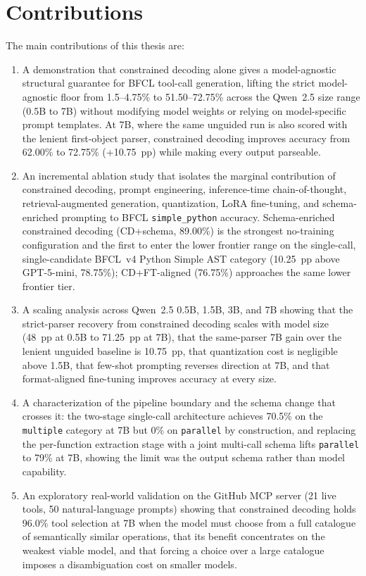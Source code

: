 \section{Contributions}

The main contributions of this thesis are:

\begin{enumerate}
    \item A demonstration that constrained decoding alone gives a
    model-agnostic structural guarantee for BFCL tool-call generation, lifting
    the strict model-agnostic floor from 1.5--4.75\% to 51.50--72.75\% across
    the Qwen~2.5 size range (0.5B to 7B) without modifying model weights or
    relying on model-specific prompt templates. At 7B, where the same unguided
    run is also scored with the lenient first-object parser, constrained
    decoding improves accuracy from 62.00\% to 72.75\% (+10.75~pp) while
    making every output parseable.
    \item An incremental ablation study that isolates the marginal
    contribution of constrained decoding, prompt engineering,
    inference-time chain-of-thought, retrieval-augmented generation,
    quantization, LoRA fine-tuning, and schema-enriched prompting to
    BFCL \texttt{simple\_python} accuracy. Schema-enriched constrained
    decoding (CD+schema, 89.00\%) is the strongest no-training
    configuration and the first to enter the lower frontier range on the
    single-call, single-candidate BFCL~v4 Python Simple AST category
    (10.25~pp above GPT-5-mini, 78.75\%); CD+FT-aligned (76.75\%)
    approaches the same lower frontier tier.
    \item A scaling analysis across Qwen~2.5 0.5B, 1.5B, 3B, and 7B
    showing that the strict-parser recovery from constrained decoding scales
    with model size (48~pp at 0.5B to 71.25~pp at 7B), that the same-parser
    7B gain over the lenient unguided baseline is 10.75~pp, that quantization
    cost is negligible above 1.5B, that few-shot prompting reverses direction
    at 7B, and that format-aligned fine-tuning improves accuracy at every size.
    \item A characterization of the pipeline boundary and the schema change that
    crosses it: the two-stage single-call architecture achieves 70.5\% on the
    \texttt{multiple} category at 7B but 0\% on \texttt{parallel} by construction,
    and replacing the per-function extraction stage with a joint multi-call schema
    lifts \texttt{parallel} to 79\% at 7B, showing the limit was the output schema
    rather than model capability.
    \item An exploratory real-world validation on the GitHub MCP server (21 live
    tools, 50 natural-language prompts) showing that constrained decoding holds
    96.0\% tool selection at 7B when the model must choose from a full catalogue
    of semantically similar operations, that its benefit concentrates on the
    weakest viable model, and that forcing a choice over a large catalogue
    imposes a disambiguation cost on smaller models.
\end{enumerate}

